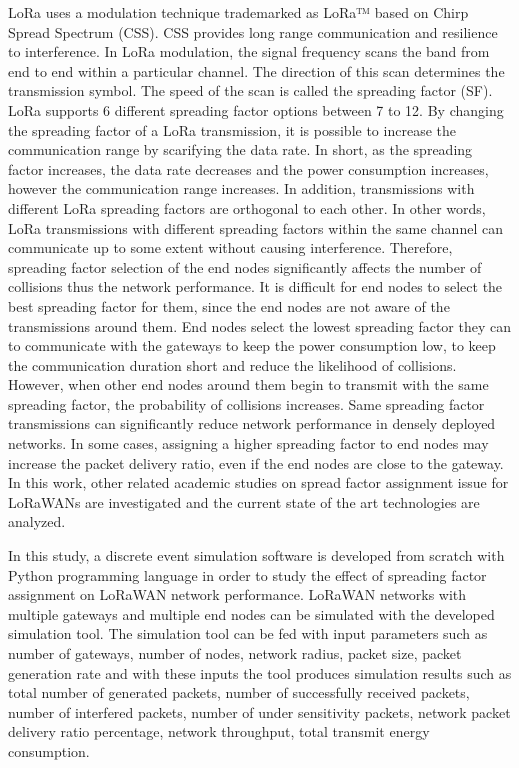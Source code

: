 LoRa uses a modulation technique trademarked as LoRa™ based on Chirp Spread Spectrum (CSS). CSS provides long range communication and resilience to interference. In LoRa modulation, the signal frequency scans the band from end to end within a particular channel. The direction of this scan determines the transmission symbol. The speed of the scan is called the spreading factor (SF). LoRa supports 6 different spreading factor options between 7 to 12. By changing the spreading factor of a LoRa transmission, it is possible to increase the communication range by scarifying the data rate. In short, as the spreading factor increases, the data rate decreases and the power consumption increases, however the communication range increases. In addition, transmissions with different LoRa spreading factors are orthogonal to each other. In other words, LoRa transmissions with different spreading factors within the same channel can communicate up to some extent without causing interference. Therefore, spreading factor selection of the end nodes significantly affects the number of collisions thus the network performance. It is difficult for end nodes to select the best spreading factor for them, since the end nodes are not aware of the transmissions around them. End nodes select the lowest spreading factor they can to communicate with the gateways to keep the power consumption low, to keep the communication duration short and reduce the likelihood of collisions. However, when other end nodes around them begin to transmit with the same spreading factor, the probability of collisions increases. Same spreading factor transmissions can significantly reduce network performance in densely deployed networks. In some cases, assigning a higher spreading factor to end nodes may increase the packet delivery ratio, even if the end nodes are close to the gateway. In this work, other related academic studies on spread factor assignment issue for LoRaWANs are investigated and the current state of the art technologies are analyzed.

In this study, a discrete event simulation software is developed from scratch with Python programming language in order to study the effect of spreading factor assignment on LoRaWAN network performance. LoRaWAN networks with multiple gateways and multiple end nodes can be simulated with the developed simulation tool. The simulation tool can be fed with input parameters such as number of gateways, number of nodes, network radius, packet size, packet generation rate and with these inputs the tool produces simulation results such as total number of generated packets, number of successfully received packets, number of interfered packets, number of under sensitivity packets, network packet delivery ratio percentage, network throughput, total transmit energy consumption.

